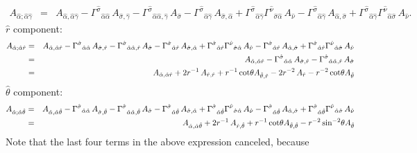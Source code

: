 \documentclass[\mydriver,12pt,twoside,notitlepage,a4paper]{article}
\begin{document}
\begin{eqnarray}
A_{\hat\alpha;\hat\alpha\hat\gamma}
&=&A_{\hat\alpha,\hat\alpha\hat\gamma}
-{\Gamma^{\hat\sigma}}_{\hat\alpha\hat\alpha}\,A_{\hat\sigma,\hat\gamma}
-{\Gamma^{\hat\sigma}}_{\hat\alpha\hat\alpha,\hat\gamma}\,A_{\hat\sigma}
-{\Gamma^{\hat\sigma}}_{\hat\alpha\hat\gamma}\,A_{\hat\sigma,\hat\alpha}
+{\Gamma^{\hat\sigma}}_{\hat\alpha\hat\gamma}{\Gamma^{\hat\nu}}_{\hat\sigma\hat\alpha}\,A_{\hat\nu}
-{\Gamma^{\hat\sigma}}_{\hat\alpha\hat\gamma}\,A_{\hat\alpha,\hat\sigma}
+{\Gamma^{\hat\sigma}}_{\hat\alpha\hat\gamma}{\Gamma^{\hat\nu}}_{\hat\alpha\hat\sigma}\,A_{\hat\nu}.
\nonumber
\end{eqnarray}
$\hat r$ component:
\begin{eqnarray}
A_{\hat\alpha;\hat\alpha\hat r}
&=&A_{\hat\alpha,\hat\alpha\hat r}
-{\Gamma^{\hat\sigma}}_{\hat\alpha\hat\alpha}\,A_{\hat\sigma,\hat r}
-{\Gamma^{\hat\sigma}}_{\hat\alpha\hat\alpha,\hat r}\,A_{\hat\sigma}
-{\Gamma^{\hat\sigma}}_{\hat\alpha\hat r}\,A_{\hat\sigma,\hat\alpha}
+{\Gamma^{\hat\sigma}}_{\hat\alpha\hat r}{\Gamma^{\hat\nu}}_{\hat\sigma\hat\alpha}\,A_{\hat\nu}
-{\Gamma^{\hat\sigma}}_{\hat\alpha\hat r}\,A_{\hat\alpha,\hat\sigma}
+{\Gamma^{\hat\sigma}}_{\hat\alpha\hat r}{\Gamma^{\hat\nu}}_{\hat\alpha\hat\sigma}\,A_{\hat\nu}
\cr
&=&A_{\hat\alpha,\hat\alpha\hat r}
-{\Gamma^{\hat\sigma}}_{\hat\alpha\hat\alpha}\,A_{\hat\sigma,\hat r}
-{\Gamma^{\hat\sigma}}_{\hat\alpha\hat\alpha,\hat r}\,A_{\hat\sigma}
\cr
&=&A_{\hat\alpha,\hat\alpha\hat r}
+2r^{-1}\,A_{\hat r,\hat r}
+r^{-1}\cot\!\theta A_{\hat\theta,\hat r}
-2r^{-2}\,A_{\hat r}
-r^{-2}\cot\!\theta A_{\hat\theta}
\end{eqnarray}
$\hat\theta$ component:
\begin{eqnarray}
A_{\hat\alpha;\hat\alpha\hat\theta}
&=&A_{\hat\alpha,\hat\alpha\hat\theta}
-{\Gamma^{\hat\sigma}}_{\hat\alpha\hat\alpha}\,A_{\hat\sigma,\hat\theta}
-{\Gamma^{\hat\sigma}}_{\hat\alpha\hat\alpha,\hat\theta}\,A_{\hat\sigma}
-{\Gamma^{\hat\sigma}}_{\hat\alpha\hat\theta}\,A_{\hat\sigma,\hat\alpha}
+{\Gamma^{\hat\sigma}}_{\hat\alpha\hat\theta}{\Gamma^{\hat\nu}}_{\hat\sigma\hat\alpha}\,A_{\hat\nu}
-{\Gamma^{\hat\sigma}}_{\hat\alpha\hat\theta}\,A_{\hat\alpha,\hat\sigma}
+{\Gamma^{\hat\sigma}}_{\hat\alpha\hat\theta}{\Gamma^{\hat\nu}}_{\hat\alpha\hat\sigma}\,A_{\hat\nu}
\cr
&=&A_{\hat\alpha,\hat\alpha\hat\theta}
+2r^{-1}\,A_{\hat r,\hat\theta}
+r^{-1}\cot\!\theta A_{\hat\theta,\hat\theta}
-r^{-2}\sin\!^{-2}\theta A_{\hat\theta}
\end{eqnarray}
Note that the last four terms in the above expression canceled, because
\end{document}

